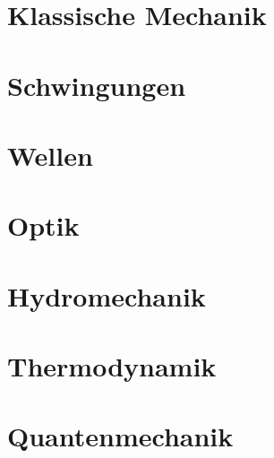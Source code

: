 \documentclass[german]{latex4ei/latex4ei_sheet}
\begin{document}
\section{Klassische Mechanik}


\section{Schwingungen}


\section{Wellen}


\section{Optik}


\section{Hydromechanik}


\section{Thermodynamik}


\section{Quantenmechanik}

\end{document}
